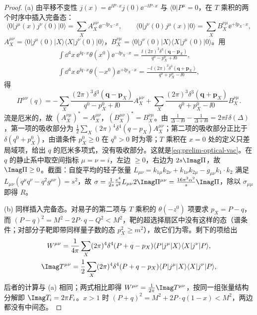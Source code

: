 \begin{proof}
(a) 由平移不变性 $j(x)=\ee^{\ii P\cdot x}j(0)\ee^{-\ii P\cdot x}$ 与 $\langle0|P^\mu=0$，在 $T$ 乘积的两个时序中插入完备态：
\[
\langle0|j^\mu(x)j^\nu(0)|0\rangle=\sum_XA_X^{\mu\nu}\ee^{-\ii p_X\cdot x},\qquad \langle0|j^\nu(0)j^\mu(x)|0\rangle=\sum_XB_X^{\nu\mu}\ee^{+\ii p_X\cdot x},
\]
$A_X^{\mu\nu}=\langle0|j^\mu(0)|X\rangle\langle X|j^\nu(0)|0\rangle$，$B_X^{\nu\mu}=\langle0|j^\nu(0)|X\rangle\langle X|j^\mu(0)|0\rangle$。用
\begin{gather*}
\int\dd^4x\,\ee^{\ii q\cdot x}\theta(x^0)\ee^{-\ii p_X\cdot x}=\frac{\ii\,(2\pi)^3\delta^3(\mathbf q-\mathbf p_X)}{q^0-p_X^0+\ii0},\\
\int\dd^4x\,\ee^{\ii q\cdot x}\theta(-x^0)\ee^{+\ii p_X\cdot x}=\frac{-\ii\,(2\pi)^3\delta^3(\mathbf q+\mathbf p_X)}{q^0+p_X^0-\ii0},
\end{gather*}
得
\[
\Pi^{\mu\nu}(q)=-\sum_X\frac{(2\pi)^3\delta^3(\mathbf q-\mathbf p_X)}{q^0-p_X^0+\ii0}A_X^{\mu\nu}+\sum_X\frac{(2\pi)^3\delta^3(\mathbf q+\mathbf p_X)}{q^0+p_X^0-\ii0}B_X^{\nu\mu}.
\]
流是厄米的，故 $(A_X^{\nu\mu})^*=A_X^{\mu\nu}$，$(B_X^{\mu\nu})^*=B_X^{\nu\mu}$。由 $\frac1{\Delta-\ii0}-\frac1{\Delta+\ii0}=2\pi\ii\,\delta(\Delta)$，第一项的吸收部分为 $\frac12\sum_X(2\pi)^4\delta^4(q-p_X)A_X^{\mu\nu}$；第二项的吸收部分正比于 $\delta(q^0+p_X^0)$，由谱条件 $p_X^0\ge0$ 在 $q^0>0$ 时为零；$T$ 乘积在 $x=0$ 处的定义只差局域项，给出 $q$ 的厄米多项式，没有吸收部分。这就是\cref{eq:prelim-optical-vac}。在 $q$ 的静止系中取空间指标 $\mu=\nu=i$，左边 $\ge0$，右边为 $2s\Imag\Pi$，故 $\Imag\Pi\ge0$。截面：自旋平均的轻子张量 $L_{\mu\nu}=k_{1\mu}k_{2\nu}+k_{1\nu}k_{2\mu}-g_{\mu\nu}k_1\cdot k_2$ 满足 $L_{\mu\nu}(q^\mu q^\nu-q^2g^{\mu\nu})=s^2$，故 $\sigma=\frac1{2s}\frac{e^4}{s^2}L_{\mu\nu}2\Imag\Pi^{\mu\nu}=\frac{16\pi^2\alpha^2}{s}\Imag\Pi$，除以 $\sigma_{\mu\mu}$ 即得 $R$。

(b) 同样插入完备态。对易子的第二项与 $T$ 乘积的 $\theta(-z^0)$ 项要求 $p_X=P-q$，而 $(P-q)^2=M^2-2P\cdot q-Q^2<M^2$，靶的超选择扇区中没有这样的态（谱条件；对部分子靶即带同样量子数的态 $p_X^2\ge m^2$），故它们为零。剩下的项给出
\begin{gather*}
W^{\mu\nu}=\frac1{4\pi}\sum_X(2\pi)^4\delta^4(P+q-p_X)\langle P|j^\mu|X\rangle\langle X|j^\nu|P\rangle,\\
\Imag T^{\mu\nu}=\frac12\sum_X(2\pi)^4\delta^4(P+q-p_X)\langle P|j^\mu|X\rangle\langle X|j^\nu|P\rangle,
\end{gather*}
后者的计算与 (a) 相同；两式相比即得 $W^{\mu\nu}=\frac1{2\pi}\Imag T^{\mu\nu}$，按同一组张量结构分解即 $\Imag T_i=2\pi F_i$。$x>1$ 时 $(P+q)^2=M^2+2P\cdot q(1-x)<M^2$，两边都没有中间态。
\end{proof}

